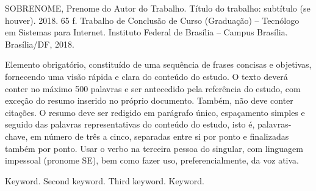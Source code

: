 SOBRENOME, Prenome do Autor do Trabalho. Título do trabalho: subtítulo (se houver).  2018. 65 f. 
Trabalho de Conclusão de Curso (Graduação) – Tecnólogo em Sistemas para Internet. 
Instituto Federal de Brasília – Campus Brasília. Brasília/DF, 2018.
\vspace{1cm}

Elemento obrigatório, constituído de uma sequência de frases concisas e objetivas,
fornecendo uma visão rápida e clara do conteúdo do estudo. O texto deverá conter no
máximo 500 palavras e ser antecedido pela referência do estudo, com exceção do resumo
inserido no próprio documento. Também, não deve conter citações. O resumo deve ser redigido
em parágrafo único, espaçamento simples e seguido das palavras representativas do conteúdo
do estudo, isto é, palavras-chave, em número de três a cinco, separadas entre si por ponto e
finalizadas também por ponto. Usar o verbo na terceira pessoa do singular, com linguagem
impessoal (pronome SE), bem como fazer uso, preferencialmente, da voz ativa.

\begin{keywords}
Keyword. Second keyword. Third keyword. Keyword.
\end{keywords}
